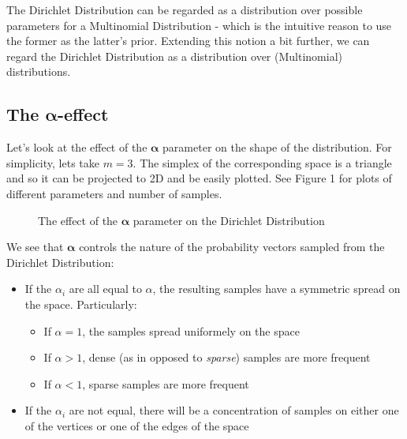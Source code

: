 \documentclass[11pt]{article}
\begin{document}
The Dirichlet Distribution can be regarded as a distribution over
possible parameters for a Multinomial Distribution - which is the
intuitive reason to use the former as the latter's prior. Extending this
notion a bit further, we can regard the Dirichlet Distribution as a
distribution over (Multinomial) distributions.
	
\subsection{The $\boldsymbol{\alpha}$-effect}\label{the-boldsymbolalpha-effect}
	
Let's look at the effect of the \(\boldsymbol\alpha\) parameter on the
shape of the distribution. For simplicity, lets take \(m=3\). The
simplex of the corresponding space is a triangle and so it can be
projected to 2D and be easily plotted. See Figure 1 for plots of different
parameters and number of samples.
		
\begin{figure}
	\caption{The effect of the $\boldsymbol\alpha$ parameter on the Dirichlet Distribution}
\end{figure}
	
We see that \(\boldsymbol\alpha\) controls the nature of the probability
vectors sampled from the Dirichlet Distribution: 

\begin{itemize} 
	\item If the \(\alpha_i\) are all equal to \(\alpha\), the resulting samples 
	have a symmetric spread on the space. Particularly:
	\begin{itemize}
		\item If \(\alpha = 1\), the samples spread uniformely on the space
		\item If \(\alpha > 1\), dense (as in opposed to \emph{sparse}) samples are more frequent 
		\item If \(\alpha < 1\), sparse samples are more frequent
	\end{itemize}	
	\item If the \(\alpha_i\) are not equal, there will be a concentration of samples on either one 
	of the vertices or one of the edges of the space
\end{itemize}	
	
\end{document}
